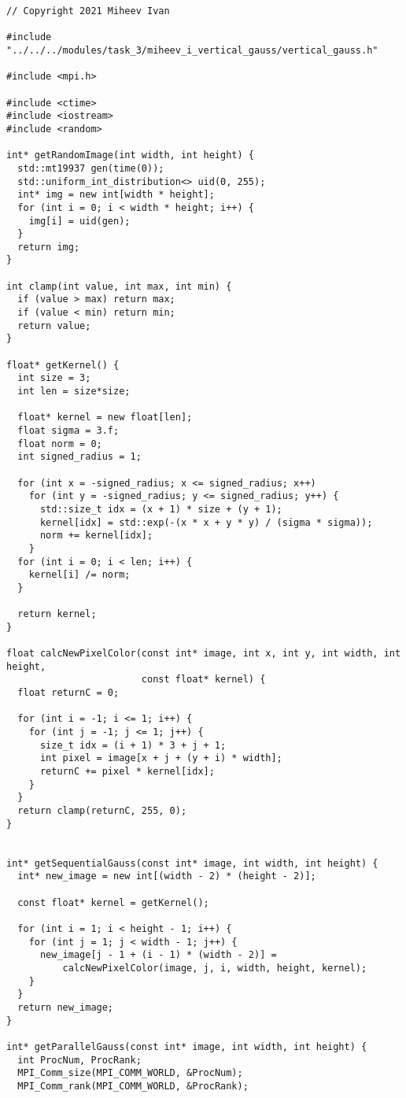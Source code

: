 \documentclass{report}
\begin{document}
\begin{lstlisting}
// Copyright 2021 Miheev Ivan

#include "../../../modules/task_3/miheev_i_vertical_gauss/vertical_gauss.h"

#include <mpi.h>

#include <ctime>
#include <iostream>
#include <random>

int* getRandomImage(int width, int height) {
  std::mt19937 gen(time(0));
  std::uniform_int_distribution<> uid(0, 255);
  int* img = new int[width * height];
  for (int i = 0; i < width * height; i++) {
    img[i] = uid(gen);
  }
  return img;
}

int clamp(int value, int max, int min) {
  if (value > max) return max;
  if (value < min) return min;
  return value;
}

float* getKernel() {
  int size = 3;
  int len = size*size;

  float* kernel = new float[len];
  float sigma = 3.f;
  float norm = 0;
  int signed_radius = 1;

  for (int x = -signed_radius; x <= signed_radius; x++)
    for (int y = -signed_radius; y <= signed_radius; y++) {
      std::size_t idx = (x + 1) * size + (y + 1);
      kernel[idx] = std::exp(-(x * x + y * y) / (sigma * sigma));
      norm += kernel[idx];
    }
  for (int i = 0; i < len; i++) {
    kernel[i] /= norm;
  }

  return kernel;
}

float calcNewPixelColor(const int* image, int x, int y, int width, int height,
                        const float* kernel) {
  float returnC = 0;

  for (int i = -1; i <= 1; i++) {
    for (int j = -1; j <= 1; j++) {
      size_t idx = (i + 1) * 3 + j + 1;
      int pixel = image[x + j + (y + i) * width];
      returnC += pixel * kernel[idx];
    }
  }
  return clamp(returnC, 255, 0);
}


int* getSequentialGauss(const int* image, int width, int height) {
  int* new_image = new int[(width - 2) * (height - 2)];

  const float* kernel = getKernel();

  for (int i = 1; i < height - 1; i++) {
    for (int j = 1; j < width - 1; j++) {
      new_image[j - 1 + (i - 1) * (width - 2)] =
          calcNewPixelColor(image, j, i, width, height, kernel);
    }
  }
  return new_image;
}

int* getParallelGauss(const int* image, int width, int height) {
  int ProcNum, ProcRank;
  MPI_Comm_size(MPI_COMM_WORLD, &ProcNum);
  MPI_Comm_rank(MPI_COMM_WORLD, &ProcRank);


\end{lstlisting}
\end{document}
